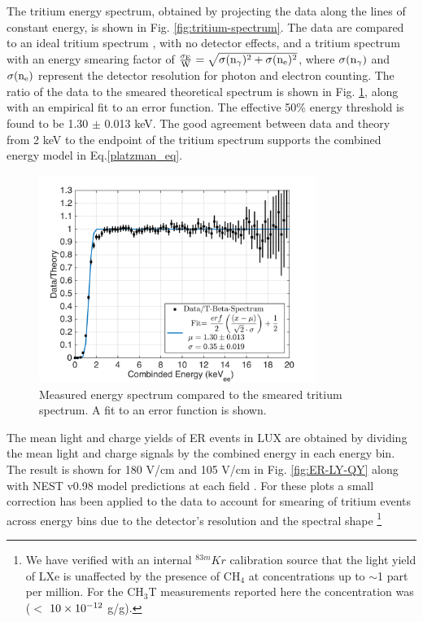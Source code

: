 The tritium energy spectrum, obtained by projecting the data along the lines of constant energy, is shown in Fig. \ref{fig:tritium-spectrum}. The data are compared to an ideal tritium spectrum \cite{Tritium_Eq_Simpson}, with no detector effects, and a tritium spectrum with an energy smearing factor of $\rm \frac{\sigma_E}{W} = \sqrt{\sigma(n_{\gamma})^2 + \sigma(n_e)^2}$, where $\rm \sigma(n_{\gamma})$ and $\rm \sigma(n_e)$ represent the detector resolution for photon and electron counting. The ratio of the data to the smeared theoretical spectrum is shown in Fig. \ref{fig:ER-threshold}, along with an empirical fit to an error function. The effective 50\% energy threshold is found to be 1.30 $\pm$ 0.013 keV. The good agreement between data and theory from 2 keV to the endpoint of the tritium spectrum supports the combined energy model in Eq.\ref{platzman_eq}.

\begin{figure}[h!]\centering
\includegraphics[width=90mm]{fig/E_Thres_Fit.png}
\caption{Measured energy spectrum compared to the smeared tritium spectrum. A fit to an error function is shown.}
\label{fig:ER-threshold}
\end{figure}




The mean light and charge yields of ER events in LUX are obtained by dividing the mean light and charge signals by the combined energy in each energy bin. The result is shown for 180 V/cm and 105 V/cm in Fig. \ref{fig:ER-LY-QY} along with NEST v0.98 model predictions at each field \cite{NEST_2013}. For these plots a small correction has been applied to the data to account for smearing of tritium events across energy bins due to the detector's resolution and the spectral shape \cite{Dobi_Thesis}\footnote{We have verified with an internal $^{83m}Kr$ calibration source that the light yield of LXe is unaffected by the presence of CH$_4$ at concentrations up to $\sim$1 part per million. For the CH$_3$T measurements reported here the concentration was ($<$ $\rm10\times10^{-12}$ g/g). }

